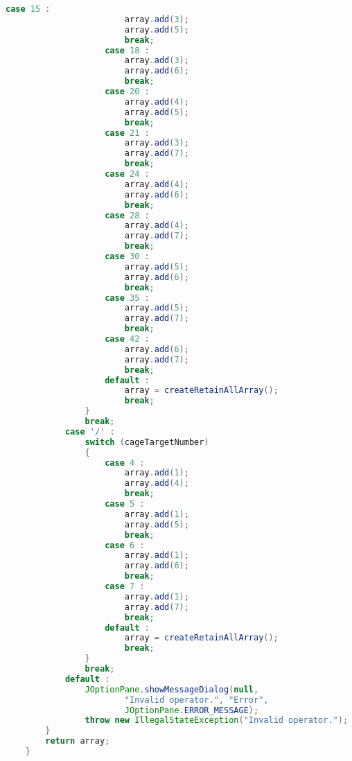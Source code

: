 \begin{lstlisting}[language=Java,basicstyle=\tiny,caption=SolverRuleBased.java]
                    case 15 :
                        array.add(3);
                        array.add(5);
                        break;
                    case 18 :
                        array.add(3);
                        array.add(6);
                        break;
                    case 20 :
                        array.add(4);
                        array.add(5);
                        break;
                    case 21 :
                        array.add(3);
                        array.add(7);
                        break;
                    case 24 :
                        array.add(4);
                        array.add(6);
                        break;
                    case 28 :
                        array.add(4);
                        array.add(7);
                        break;
                    case 30 :
                        array.add(5);
                        array.add(6);
                        break;
                    case 35 :
                        array.add(5);
                        array.add(7);
                        break;
                    case 42 :
                        array.add(6);
                        array.add(7);
                        break;
                    default :
                        array = createRetainAllArray();
                        break;
                }
                break;
            case '/' :
                switch (cageTargetNumber)
                {
                    case 4 :
                        array.add(1);
                        array.add(4);
                        break;
                    case 5 :
                        array.add(1);
                        array.add(5);
                        break;
                    case 6 :
                        array.add(1);
                        array.add(6);
                        break;
                    case 7 :
                        array.add(1);
                        array.add(7);
                        break;
                    default :
                        array = createRetainAllArray();
                        break;
                }
                break;
            default :
                JOptionPane.showMessageDialog(null, 
                        "Invalid operator.", "Error", 
                        JOptionPane.ERROR_MESSAGE);
                throw new IllegalStateException("Invalid operator.");
        }
        return array;
    }
    

\end{lstlisting}
